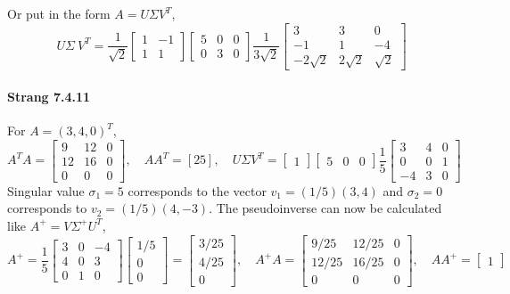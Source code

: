 \documentclass[10pt]{scrartcl}
\begin{document}
Or put in the form $A=U\Sigma V^T$,
\[U\Sigma\ V^T = \frac{1}{\sqrt{2}}\begin{bmatrix}1&-1\\1&1\end{bmatrix}\begin{bmatrix}5&0&0\\0&3&0\end{bmatrix}\frac{1}{3\sqrt{2}}\begin{bmatrix}3&3&0\\-1&1&-4\\-2\sqrt{2}&2\sqrt{2}&\sqrt{2}\end{bmatrix}\]

\paragraph{Strang 7.4.11} For $A=(3,4,0)^T$,
\[A^T A = \begin{bmatrix}9&12&0\\12&16&0\\0&0&0\end{bmatrix},\quad A A^T = [25],\quad U\Sigma V^T = \begin{bmatrix}1\end{bmatrix}\begin{bmatrix}5&0&0\end{bmatrix}\frac{1}{5}\begin{bmatrix}3&4&0\\0&0&1\\-4&3&0\end{bmatrix}\]
Singular value $\sigma_1=5$ corresponds to the vector $v_1 =(1/5)(3,4)$ and $\sigma_2=0$ corresponds to $v_2=(1/5)(4,-3)$. The pseudoinverse can now be calculated like $A^{+} = V\Sigma^{+}U^T$,
\[ A^{+}= \frac{1}{5}\begin{bmatrix}3&0&-4\\4&0&3\\0&1&0\end{bmatrix}\begin{bmatrix}1/5\\0\\0\end{bmatrix}=\begin{bmatrix}3/25\\4/25\\0\end{bmatrix},\quad
A^{+} A = \begin{bmatrix}9/25&12/25&0\\12/25&16/25&0\\0&0&0\end{bmatrix},\quad A A^{+} = \begin{bmatrix}1\end{bmatrix}\]
\end{document}
